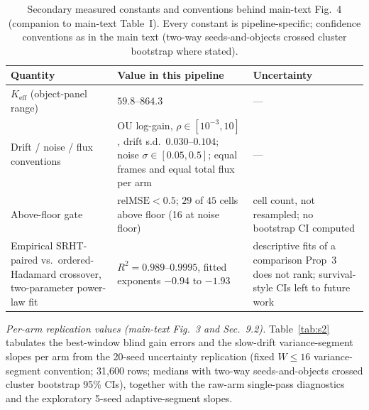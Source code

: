 \documentclass[journal,twoside]{IEEEtran}
\begin{document}
\begin{table}[t]
\centering
\caption{Secondary measured constants and conventions behind main-text Fig.~4 (companion to main-text Table~I). Every constant is pipeline-specific; confidence conventions as in the main text (two-way seeds-and-objects crossed cluster bootstrap where stated).}
\label{tab:s1}
\begin{tabular}{@{}p{}p{}p{}@{}}
\toprule
Quantity & Value in this pipeline & Uncertainty \\
\midrule
$K_{\mathrm{eff}}$ (object-panel range) & $59.8$--$864.3$ & --- \\
\addlinespace
Drift / noise / flux conventions & OU log-gain, $\rho\in[10^{-3},10]$, drift s.d.\ $0.030$--$0.104$; noise $\sigma\in[0.05,0.5]$; equal frames and equal total flux per arm & --- \\
\addlinespace
Above-floor gate & $\mathrm{relMSE}<0.5$; $29$ of $45$ cells above floor (16 at noise floor) & cell count, not resampled; no bootstrap CI computed \\
\addlinespace
Empirical SRHT-paired vs.\ ordered-Hadamard crossover, two-parameter power-law fit & $R^2=0.989$--$0.9995$, fitted exponents $-0.94$ to $-1.93$ & descriptive fits of a comparison Prop~3 does not rank; survival-style CIs left to future work \\
\bottomrule
\end{tabular}
\end{table}

\emph{Per-arm replication values (main-text Fig.~3 and Sec.~9.2).} Table~\ref{tab:s2} tabulates the best-window blind gain errors and the slow-drift variance-segment slopes per arm from the 20-seed uncertainty replication (fixed $W\le16$ variance-segment convention; 31{,}600 rows; medians with two-way seeds-and-objects crossed cluster bootstrap 95\% CIs), together with the raw-arm single-pass diagnostics and the exploratory 5-seed adaptive-segment slopes.
\end{document}
